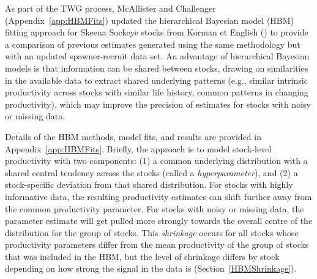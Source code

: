 \documentclass[french,11pt]{book}
\begin{document}
As part of the TWG process, McAllister and Challenger (Appendix~\ref{app:HBMFits}) updated the hierarchical Bayesian model (HBM) fitting approach for Skeena Sockeye stocks from Korman et English () to provide a comparison of previous estimates generated using the same methodology but with an updated spawner-recruit data set. An advantage of hierarchical Bayesian models is that information can be shared between stocks, drawing on similarities in the available data to extract shared underlying patterns (e.g., similar intrinsic productivity across stocks with similar life history, common patterns in changing productivity), which may improve the precision of estimates for stocks with noisy or missing data.

Details of the HBM methods, model fits, and results are provided in Appendix~\ref{app:HBMFits}. Briefly, the approach is to model stock-level productivity with two components: (1) a common underlying distribution with a shared central tendency across the stocks (called a \emph{hyperparameter}), and (2) a stock-specific deviation from that shared distribution. For stocks with highly informative data, the resulting productivity estimates can shift further away from the common productivity parameter. For stocks with noisy or missing data, the parameter estimate will get pulled more strongly towards the overall centre of the distribution for the group of stocks. This \emph{shrinkage} occurs for all stocks whose productivity parameters differ from the mean productivity of the group of stocks that was included in the HBM, but the level of shrinkage differs by stock depending on how strong the signal in the data is (Section~\ref{HBMShrinkage}).
\end{document}
